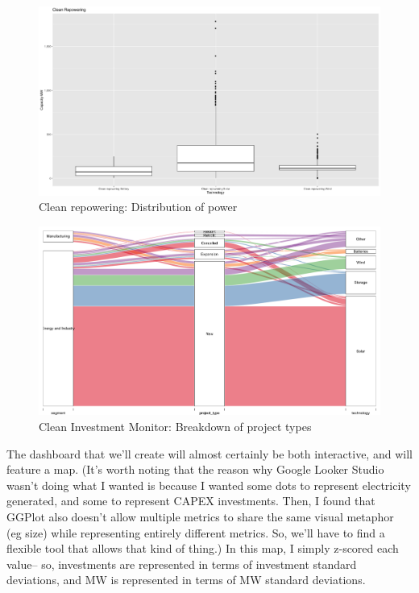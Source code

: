 \documentclass{article}
\begin{document}
\begin{figure}
  \includegraphics[width=\linewidth]{images/cr_boxplot.png}
  \caption{Clean repowering: Distribution of power}
\end{figure}

\begin{figure}
  \includegraphics[width=\linewidth]{images/cim_alluvial.png}
  \caption{Clean Investment Monitor: Breakdown of project types}
\end{figure}

The dashboard that we'll create will almost certainly be both interactive, and will feature a map.
(It's worth noting that the reason why Google Looker Studio wasn't doing what I wanted is because I wanted some dots to represent electricity generated, and some to represent CAPEX investments.
Then, I found that GGPlot also doesn't allow multiple metrics to share the same visual metaphor (eg size) while representing entirely different metrics.
So, we'll have to find a flexible tool that allows that kind of thing.)
In this map, I simply z-scored each value-- so, investments are represented in terms of investment standard deviations, and MW is represented in terms of MW standard deviations.
\end{document}
